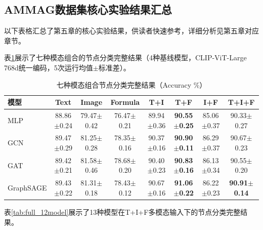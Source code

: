 
\begin{appendices}

\section{AMMAG数据集核心实验结果汇总}

以下表格汇总了第五章的核心实验结果，供读者快速参考，详细分析见第五章对应章节。

表\ref{tab:full_nc}展示了七种模态组合的节点分类完整结果（4种基线模型，CLIP-ViT-Large 768d统一编码，5次运行均值$\pm$标准差）。

\begin{table}[htbp]
  \centering
  \caption{七种模态组合节点分类完整结果（Accuracy \%）}
  \label{tab:full_nc}
  \small
  \begin{tabular}{lccccccc}
    \toprule
    模型 & Text & Image & Formula & T+I & T+F & I+F & T+I+F \\
    \midrule
    MLP & 88.86$\pm$0.24 & 79.47$\pm$0.42 & 76.47$\pm$0.21 & 89.94$\pm$0.36 & \textbf{90.55$\pm$0.25} & 85.06$\pm$0.37 & 90.33$\pm$0.27 \\
    GCN & 89.47$\pm$0.29 & 81.25$\pm$0.28 & 78.35$\pm$0.16 & 90.37$\pm$0.16 & \textbf{90.90$\pm$0.11} & 86.29$\pm$0.37 & 90.67$\pm$0.23 \\
    GAT & 89.42$\pm$0.21 & 81.58$\pm$0.46 & 78.68$\pm$0.20 & 90.40$\pm$0.23 & \textbf{90.83$\pm$0.16} & 86.13$\pm$0.34 & 90.55$\pm$0.20 \\
    GraphSAGE & 89.43$\pm$0.22 & 81.31$\pm$0.18 & 78.43$\pm$0.12 & 90.67$\pm$0.16 & \textbf{91.06$\pm$0.22} & 86.22$\pm$0.23 & \textbf{90.91$\pm$0.14} \\
    \bottomrule
  \end{tabular}
\end{table}

表\ref{tab:full_12model}展示了13种模型在T+I+F多模态输入下的节点分类完整结果。


\end{appendices}
